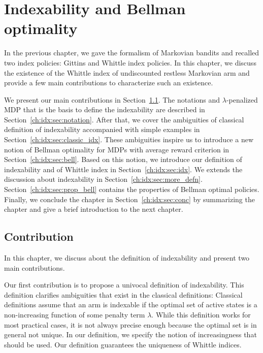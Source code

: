 \begingroup

\let\clearpage\relax

\chapter{Indexability and Bellman optimality }
\label{ch:indexability}

In the previous chapter, we gave the formalism of Markovian bandits and recalled two index policies: Gittins and Whittle index policies.
In this chapter, we discuss the existence of the Whittle index of undiscounted restless Markovian arm and provide a few main contributions to characterize such an existence.

We present our main contributions in Section~\ref{ch:idx:sec:contrib}. The notations and $\lambda$-penalized MDP that is the basis to define the indexability are described in Section~\ref{ch:idx:sec:notation}.
After that, we cover the ambiguities of classical definition of indexability accompanied with simple examples in Section~\ref{ch:idx:sec:classic_idx}.
These ambiguities inspire us to introduce a new notion of Bellman optimality for MDPs with average reward criterion in Section~\ref{ch:idx:sec:bell}.
Based on this notion, we introduce our definition of indexability and of Whittle index in Section~\ref{ch:idx:sec:idx}.
We extends the discussion about indexability in Section~\ref{ch:idx:sec:more_defn}.
Section~\ref{ch:idx:sec:prop_bell} contains the properties of Bellman optimal policies.
Finally, we conclude the chapter in Section~\ref{ch:idx:sec:conc} by summarizing the chapter and give a brief introduction to the next chapter.


\section{Contribution}
\label{ch:idx:sec:contrib}

In this chapter, we discuss about the definition of indexability and present two main contributions.

Our first contribution is to propose a univocal definition of indexability. This definition clarifies ambiguities that exist in the classical definitions: Classical definitions assume that an arm is indexable if the optimal set of active states is a non-increasing function of some penalty term $\lambda$. While this definition works for most practical cases, it is not always precise enough because the optimal set is in general not unique. In our definition, we specify the notion of increasingness that should be used. Our definition guarantees the uniqueness of Whittle indices.

